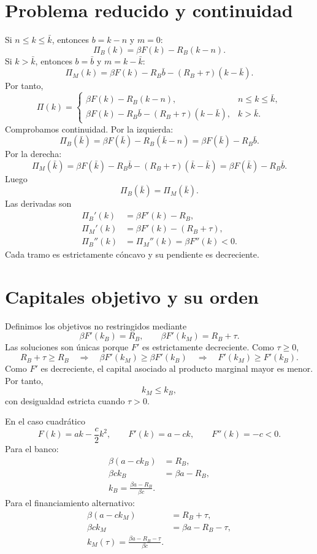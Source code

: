 \documentclass[11pt]{article}
\newcommand{\Rb}{R_B}
\newcommand{\kb}{k_B}
\newcommand{\km}{k_M}
\begin{document}
\newpage
\section{Problema reducido y continuidad}

Si $n\leq k\leq\bar k$, entonces $b=k-n$ y $m=0$:
\[
\Pi_B(k)=\beta F(k)-\Rb(k-n).
\]
Si $k>\bar k$, entonces $b=\bar b$ y $m=k-\bar k$:
\[
\Pi_M(k)=\beta F(k)-\Rb\bar b-(\Rb+\tau)(k-\bar k).
\]
Por tanto,
\[
\boxed{
\Pi(k)=
\begin{cases}
\beta F(k)-\Rb(k-n),&n\leq k\leq\bar k,\\[3pt]
\beta F(k)-\Rb\bar b-(\Rb+\tau)(k-\bar k),&k>\bar k.
\end{cases}}
\]
Comprobamos continuidad. Por la izquierda:
\[
\Pi_B(\bar k)=\beta F(\bar k)-\Rb(\bar k-n)
=\beta F(\bar k)-\Rb\bar b.
\]
Por la derecha:
\[
\Pi_M(\bar k)=\beta F(\bar k)-\Rb\bar b
-(\Rb+\tau)(\bar k-\bar k)
=\beta F(\bar k)-\Rb\bar b.
\]
Luego
\[
\boxed{\Pi_B(\bar k)=\Pi_M(\bar k).}
\]
Las derivadas son
\begin{align*}
\Pi_B'(k)&=\beta F'(k)-\Rb,\\
\Pi_M'(k)&=\beta F'(k)-(\Rb+\tau),\\
\Pi_B''(k)&=\Pi_M''(k)=\beta F''(k)<0.
\end{align*}
Cada tramo es estrictamente cóncavo y su pendiente es decreciente.

\newpage
\section{Capitales objetivo y su orden}

Definimos los objetivos no restringidos mediante
\[
\beta F'(\kb)=\Rb,\qquad
\beta F'(\km)=\Rb+\tau.
\]
Las soluciones son únicas porque $F'$ es estrictamente decreciente. Como
$\tau\geq0$,
\[
\Rb+\tau\geq\Rb
\quad\Longrightarrow\quad
\beta F'(\km)\geq\beta F'(\kb)
\quad\Longrightarrow\quad
F'(\km)\geq F'(\kb).
\]
Como $F'$ es decreciente, el capital asociado al producto marginal mayor es
menor. Por tanto,
\[
\boxed{\km\leq\kb,}
\]
con desigualdad estricta cuando $\tau>0$.

En el caso cuadrático
\[
F(k)=ak-\frac{c}{2}k^2,\qquad F'(k)=a-ck,\qquad F''(k)=-c<0.
\]
Para el banco:
\begin{align*}
\beta(a-c\kb)&=\Rb,\\
\beta c\kb&=\beta a-\Rb,\\
\boxed{\kb=\frac{\beta a-\Rb}{\beta c}.}
\end{align*}
Para el financiamiento alternativo:
\begin{align*}
\beta(a-c\km)&=\Rb+\tau,\\
\beta c\km&=\beta a-\Rb-\tau,\\
\boxed{\km(\tau)=\frac{\beta a-\Rb-\tau}{\beta c}.}
\end{align*}
\end{document}
